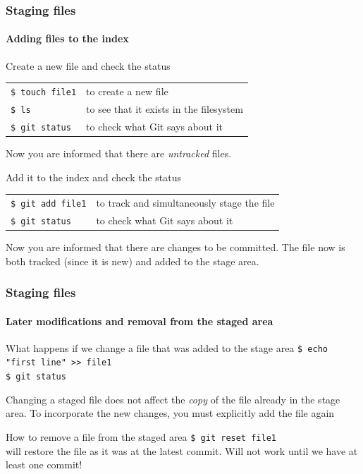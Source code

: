 \begin{frame}
\frametitle{Staging files}
\framesubtitle{Adding files to the index}

\begin{block}{Create a new file and check the status}
\begin{tabular}{ll}
\texttt{\$ touch file1} & to create a new file \\
\texttt{\$ ls} & to see that it exists in the filesystem \\
\texttt{\$ git status} & to check what Git says about it
\end{tabular}

\medskip
Now you are informed that there are {\em untracked} files.
\end{block}

\pause

\begin{block}{Add it to the index and check the status}
\begin{tabular}{ll}
\texttt{\$ git add file1} & to track and simultaneously stage the file \\
\texttt{\$ git status} & to check what Git says about it
\end{tabular}

\medskip
Now you are informed that there are changes to be committed. The file now is both tracked (since it is new) and added to the stage area.
\end{block}

\end{frame}

\begin{frame}
\frametitle{Staging files}
\framesubtitle{Later modifications and removal from the staged area}

\begin{block}{What happens if we change a file that was added to the stage area}
\texttt{\$ echo "first line" >\;\!\!> file1} \\
\texttt{\$ git status} 

\medskip
Changing a staged file does not affect the {\em copy} of the file already in the stage area.
To incorporate the new changes, you must explicitly add the file again
\end{block}

\pause
\begin{block}{How to remove a file from the staged area}
\texttt{\$ git reset file1} \\
will restore the file as it was at the latest commit. Will not work until we have at least one commit!
\end{block}

\end{frame}

